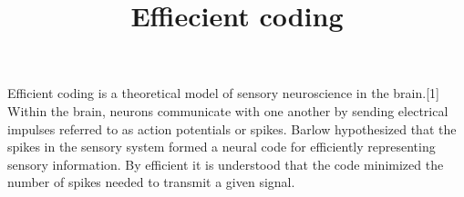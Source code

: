 \documentclass[a4paper]{article}
\title{Effiecient coding}
\date{}
\begin{document}
    \maketitle
    Efficient coding\cite{barlow-1961-possible-principles-underlying-the-transformation-of-sensory-messages} is a theoretical model of sensory neuroscience in the brain.[1] Within the brain, neurons communicate with one another by sending electrical impulses referred to as action potentials or spikes. Barlow hypothesized that the spikes in the sensory system formed a neural code for efficiently representing sensory information. By efficient it is understood that the code minimized the number of spikes needed to transmit a given signal.
    
    
\end{document}
